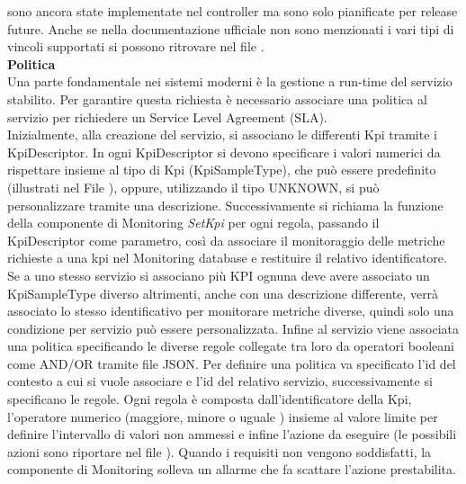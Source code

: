 sono ancora state implementate nel controller ma sono solo pianificate per release future.
Anche se nella documentazione ufficiale non sono menzionati i vari tipi di vincoli supportati 
si possono ritrovare nel file \cite{vincoli}.
\\\textbf{Politica}
\\Una parte fondamentale nei sistemi moderni è la gestione a run-time del servizio stabilito\cite{demo}.
Per garantire questa richiesta è necessario associare una politica al servizio per richiedere un Service Level Agreement (SLA).
\\Inizialmente, alla creazione del servizio, si associano le differenti Kpi tramite i KpiDescriptor.
In ogni KpiDescriptor  si devono specificare i valori numerici da rispettare insieme al tipo di Kpi (KpiSampleType), che può essere predefinito (illustrati nel File \cite{kpi}),
oppure, utilizzando il tipo UNKNOWN, si può personalizzare tramite una descrizione.
Successivamente si richiama la funzione della componente di Monitoring \textit{SetKpi} per ogni regola, passando il KpiDescriptor come parametro, così da
associare il monitoraggio delle metriche richieste a una kpi nel Monitoring database e restituire il relativo identificatore.
Se a uno stesso servizio si associano più KPI ognuna deve avere associato un KpiSampleType diverso altrimenti, anche con una descrizione differente,
verrà associato lo stesso identificativo per monitorare metriche diverse, quindi solo una condizione per servizio può essere personalizzata.
Infine al servizio viene associata una politica specificando le diverse regole collegate tra loro da operatori booleani come AND/OR tramite file JSON.
Per definire una politica va specificato l'id del contesto a cui si vuole associare e l'id del relativo servizio, successivamente si specificano le regole.
Ogni regola è composta dall'identificatore della Kpi, l'operatore numerico (maggiore, minore o uguale \cite{op}) insieme al valore limite 
per definire l'intervallo di valori non ammessi e infine l'azione da eseguire (le possibili azioni sono riportare nel file \cite{az}).
Quando i requisiti non vengono soddisfatti, la componente di Monitoring solleva un allarme che fa scattare l'azione prestabilita.

